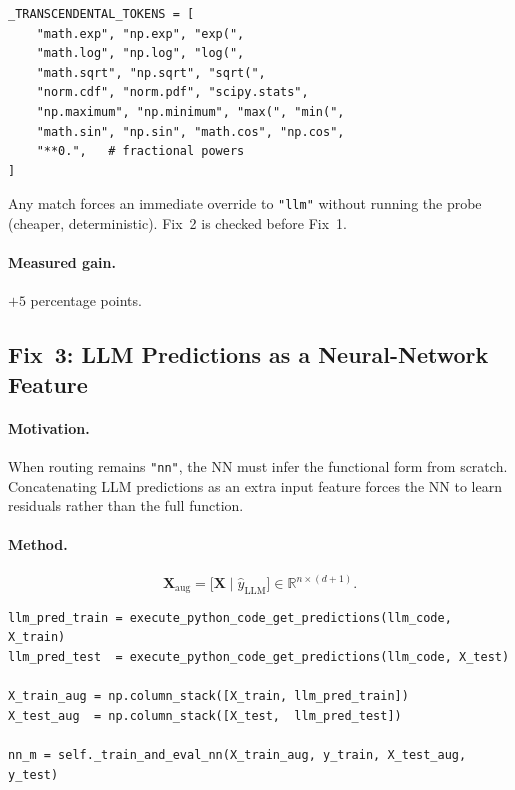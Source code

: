 \documentclass[twoside,11pt]{article}
\begin{document}
\begin{lstlisting}[caption={Transcendental token list.}]
_TRANSCENDENTAL_TOKENS = [
    "math.exp", "np.exp", "exp(",
    "math.log", "np.log", "log(",
    "math.sqrt", "np.sqrt", "sqrt(",
    "norm.cdf", "norm.pdf", "scipy.stats",
    "np.maximum", "np.minimum", "max(", "min(",
    "math.sin", "np.sin", "math.cos", "np.cos",
    "**0.",   # fractional powers
]
\end{lstlisting}

Any match forces an immediate override to \texttt{"llm"} without running the
probe (cheaper, deterministic).  Fix~2 is checked before Fix~1.

\paragraph{Measured gain.} $+5$ percentage points.

\subsection{Fix~3: LLM Predictions as a Neural-Network Feature}

\paragraph{Motivation.}
When routing remains \texttt{"nn"}, the NN must infer the functional form from
scratch.  Concatenating LLM predictions as an extra input feature forces the
NN to learn residuals rather than the full function.

\paragraph{Method.}

\[
  \mathbf{X}_{\text{aug}}
  = \bigl[\mathbf{X} \;\big|\; \hat{y}_{\text{LLM}}\bigr]
  \in \mathbb{R}^{n \times (d+1)}.
\]

\begin{lstlisting}[caption={LLM-feature augmentation.}]
llm_pred_train = execute_python_code_get_predictions(llm_code, X_train)
llm_pred_test  = execute_python_code_get_predictions(llm_code, X_test)

X_train_aug = np.column_stack([X_train, llm_pred_train])
X_test_aug  = np.column_stack([X_test,  llm_pred_test])

nn_m = self._train_and_eval_nn(X_train_aug, y_train, X_test_aug, y_test)
\end{lstlisting}
\end{document}
